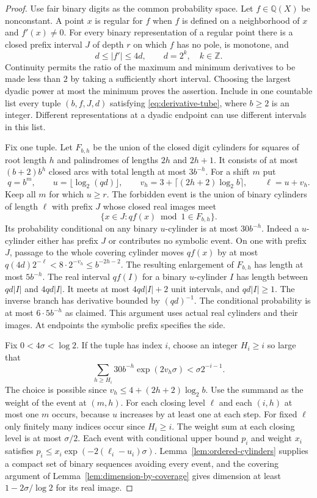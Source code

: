\begin{proof}
Use fair binary digits as the common probability space. Let $f\in\mathbb Q(X)$ be nonconstant. A point $x$ is regular for $f$ when $f$ is defined on a neighborhood of $x$ and $f'(x)\ne0$. For every binary representation of a regular point there is a closed prefix interval $J$ of depth $r$ on which $f$ has no pole, is monotone, and
\begin{equation}\label{eq:derivative-tube}
                         d\le |f'|\le 4d,\qquad d=2^k,\quad k\in\mathbb Z.
\end{equation}
Continuity permits the ratio of the maximum and minimum derivatives to be made less than $2$ by taking a sufficiently short interval. Choosing the largest dyadic power at most the minimum proves the assertion. Include in one countable list every tuple $(b,f,J,d)$ satisfying \eqref{eq:derivative-tube}, where $b\ge2$ is an integer. Different representations at a dyadic endpoint can use different intervals in this list.

Fix one tuple. Let $F_{b,h}$ be the union of the closed digit cylinders for squares of root length $h$ and palindromes of lengths $2h$ and $2h+1$. It consists of at most $(b+2)b^h$ closed arcs with total length at most $3b^{-h}$. For a shift $m$ put
\[
 q=b^m,\qquad u=\lfloor\log_2(qd)\rfloor,\qquad
 v_h=3+\lceil(2h+2)\log_2 b\rceil,\qquad \ell=u+v_h.
\]
Keep all $m$ for which $u\ge r$. The forbidden event is the union of binary cylinders of length $\ell$ with prefix $J$ whose closed real images meet
\[
       \{x\in J:q f(x)\bmod 1\in F_{b,h}\}.
\]
Its probability conditional on any binary $u$-cylinder is at most $30b^{-h}$. Indeed a $u$-cylinder either has prefix $J$ or contributes no symbolic event. On one with prefix $J$, passage to the whole covering cylinder moves $qf(x)$ by at most
$q(4d)2^{-\ell}<8\cdot2^{-v_h}\le b^{-2h-2}$. The resulting enlargement of $F_{b,h}$ has length at most $5b^{-h}$. The real interval $qf(I)$ for a binary $u$-cylinder $I$ has length between $qd|I|$ and $4qd|I|$. It meets at most $4qd|I|+2$ unit intervals, and $qd|I|\ge1$. The inverse branch has derivative bounded by $(qd)^{-1}$. The conditional probability is at most $6\cdot5b^{-h}$ as claimed. This argument uses actual real cylinders and their images. At endpoints the symbolic prefix specifies the side.

Fix $0<4\sigma<\log 2$. If the tuple has index $i$, choose an integer $H_i\ge i$ so large that
\[
       \sum_{h\ge H_i}30 b^{-h}\exp(2v_h\sigma)
                              <\sigma 2^{-i-1}.
\]
The choice is possible since $v_h\le4+(2h+2)\log_2 b$. Use the summand as the weight of the event at $(m,h)$. For each closing level $\ell$ and each $(i,h)$ at most one $m$ occurs, because $u$ increases by at least one at each step. For fixed $\ell$ only finitely many indices occur since $H_i\ge i$. The weight sum at each closing level is at most $\sigma/2$. Each event with conditional upper bound $p_i$ and weight $x_i$ satisfies $p_i\le x_i\exp(-2(\ell_i-u_i)\sigma)$. Lemma~\ref{lem:ordered-cylinders} supplies a compact set of binary sequences avoiding every event, and the covering argument of Lemma~\ref{lem:dimension-by-coverage} gives dimension at least $1-2\sigma/\log2$ for its real image.


\end{proof}
